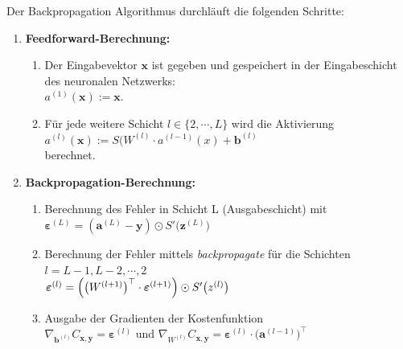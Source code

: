 \noindent
Der Backpropagation Algorithmus durchläuft die folgenden Schritte:
\begin{enumerate}
\item \textbf{Feedforward-Berechnung:}
\begin{enumerate}
\item Der Eingabevektor $\textbf{x}$ ist gegeben und gespeichert in der Eingabeschicht des neuronalen Netzwerks:
\\[0.2cm]
\hspace*{1.3cm}
$a^{(1)}(\mathbf{x}) := \mathbf{x}$.
\\[0.2cm]
\item Für jede weitere Schicht $l \in \{2,\cdots , L\}$ wird die Aktivierung 
\\[0.2cm]
\hspace*{1.3cm}
$a^{(l)}(\mathbf{x}) := S(W^{(l)} \cdot a^{(l-1)}(x) + \mathbf{b}^{(l)}$
\\[0.2cm] 
berechnet.
\end{enumerate}
\item \textbf{Backpropagation-Berechnung:}
\begin{enumerate}
\item Berechnung des Fehler in Schicht L (Ausgabeschicht) mit 
\\[0.2cm]
\hspace*{1.3cm}
$\boldsymbol{\varepsilon}^{(L)} = (\mathbf{a}^{(L)} - \mathbf{y}) \odot S'\bigl(\mathbf{z}^{(L)}\bigr)  $
\\[0.2cm] 

\item Berechnung der Fehler mittels \textit{backpropagate} für die Schichten $l = L-1, L-2, \cdots , 2$
\\[0.2cm]
\hspace*{1.3cm}
$\boldsymbol{\varepsilon}^{(l)} = \Bigl(\bigl(W^{(l+1)}\bigr)^\top \cdot \boldsymbol{\varepsilon}^{(l+1)}\Bigr) \odot
  S'\bigl(z^{(l)}\bigr)$
\\[0.2cm] 

\item Ausgabe der Gradienten der Kostenfunktion 
\\[0.2cm]
\hspace*{1.3cm}
$\nabla_{\mathbf{b}^{(l)}} C_{\mathbf{x}, \mathbf{y}} = \boldsymbol{\varepsilon}^{(l)}$ \quad und \quad
$\nabla_{W^{(l)}} C_{\mathbf{x}, \mathbf{y}} = \boldsymbol{\varepsilon}^{(l)} \cdot \bigl(\mathbf{a}^{(l-1)}\bigr)^\top$
\\[0.2cm] 
\end{enumerate}
\end{enumerate}

